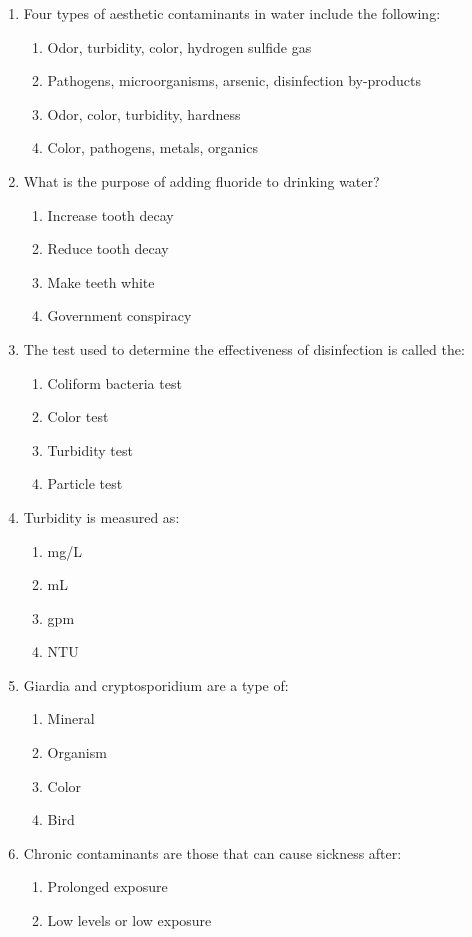 \documentclass{article}
\begin{document}
\begin{enumerate}[1.]
\item Four types of aesthetic contaminants in water include the following:
\begin{enumerate}
\item Odor, turbidity, color, hydrogen sulfide gas
\item Pathogens, microorganisms, arsenic, disinfection by-products
\item Odor, color, turbidity, hardness
\item Color, pathogens, metals, organics
\end{enumerate}

\item What is the purpose of adding fluoride to drinking water?
\begin{enumerate}
\item Increase tooth decay
\item Reduce tooth decay
\item Make teeth white
\item Government conspiracy
\end{enumerate}

\item The test used to determine the effectiveness of disinfection is called the:
\begin{enumerate}
\item Coliform bacteria test
\item Color test
\item Turbidity test
\item Particle test
\end{enumerate}

\item Turbidity is measured as:
\begin{enumerate}
\item mg/L
\item mL
\item gpm
\item NTU
\end{enumerate}

\item Giardia and cryptosporidium are a type of:
\begin{enumerate}
\item Mineral
\item Organism
\item Color
\item Bird
\end{enumerate}

\item Chronic contaminants are those that can cause sickness after:
\begin{enumerate}
\item Prolonged exposure
\item Low levels or low exposure
\end{enumerate}


\end{enumerate}
\end{document}
